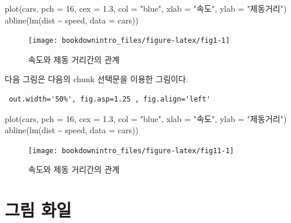 \documentclass[
]{book}
\newenvironment{Shaded}{\begin{snugshade}}{\end{snugshade}}
\newcommand{\AttributeTok}[1]{\textcolor[rgb]{0.77,0.63,0.00}{#1}}
\newcommand{\DecValTok}[1]{\textcolor[rgb]{0.00,0.00,0.81}{#1}}
\newcommand{\FloatTok}[1]{\textcolor[rgb]{0.00,0.00,0.81}{#1}}
\newcommand{\FunctionTok}[1]{\textcolor[rgb]{0.00,0.00,0.00}{#1}}
\newcommand{\NormalTok}[1]{#1}
\newcommand{\SpecialCharTok}[1]{\textcolor[rgb]{0.00,0.00,0.00}{#1}}
\newcommand{\StringTok}[1]{\textcolor[rgb]{0.31,0.60,0.02}{#1}}
\theoremstyle{definition}
\theoremstyle{definition}
\theoremstyle{definition}
\theoremstyle{definition}
\theoremstyle{remark}
\begin{document}
\begin{Shaded}
\begin{Highlighting}[]
\FunctionTok{plot}\NormalTok{(cars, }\AttributeTok{pch =} \DecValTok{16}\NormalTok{, }\AttributeTok{cex =} \FloatTok{1.3}\NormalTok{, }\AttributeTok{col =} \StringTok{"blue"}\NormalTok{, }\AttributeTok{xlab =} \StringTok{"속도"}\NormalTok{, }\AttributeTok{ylab =} \StringTok{"제동거리"}\NormalTok{)}
\FunctionTok{abline}\NormalTok{(}\FunctionTok{lm}\NormalTok{(dist }\SpecialCharTok{\textasciitilde{}}\NormalTok{ speed, }\AttributeTok{data =}\NormalTok{ cars))}
\end{Highlighting}
\end{Shaded}

\begin{figure}

{\centering \texttt{[image: bookdownintro\_files/figure-latex/fig1-1]} 

}

\caption{속도와 제동 거리간의 관계}\label{fig:fig1}
\end{figure}

다음 그림은 다음의 chunk 선택문을 이용한 그림이다.

\begin{verbatim}
 out.width='50%', fig.asp=1.25 , fig.align='left'
\end{verbatim}

\begin{Shaded}
\begin{Highlighting}[]
\FunctionTok{plot}\NormalTok{(cars, }\AttributeTok{pch =} \DecValTok{16}\NormalTok{, }\AttributeTok{cex =} \FloatTok{1.3}\NormalTok{, }\AttributeTok{col =} \StringTok{"blue"}\NormalTok{, }\AttributeTok{xlab =} \StringTok{"속도"}\NormalTok{, }\AttributeTok{ylab =} \StringTok{"제동거리"}\NormalTok{)}
\FunctionTok{abline}\NormalTok{(}\FunctionTok{lm}\NormalTok{(dist }\SpecialCharTok{\textasciitilde{}}\NormalTok{ speed, }\AttributeTok{data =}\NormalTok{ cars))}
\end{Highlighting}
\end{Shaded}

\begin{figure}

\texttt{[image: bookdownintro\_files/figure-latex/fig11-1]} \hfill{}

\caption{속도와 제동 거리간의 관계}\label{fig:fig11}
\end{figure}

\hypertarget{uxadf8uxb9bc-uxd654uxc77c}{%
\section{그림 화일}\label{uxadf8uxb9bc-uxd654uxc77c}}
\end{document}
